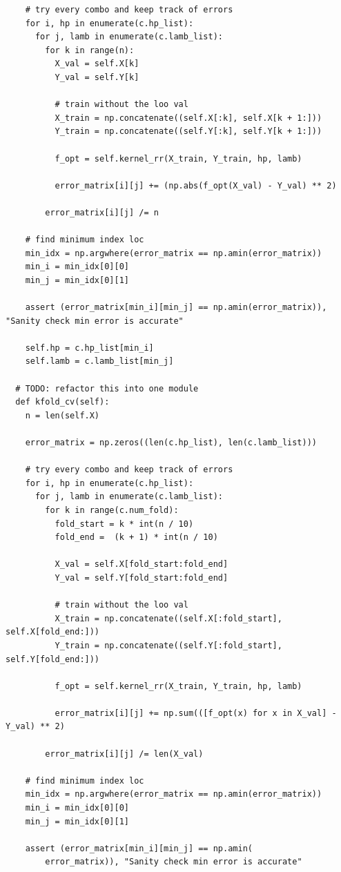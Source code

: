 \documentclass{article}
\newcommand{\1}{\mathbf{1}}
\begin{document}
{\begin{verbatim}
    # try every combo and keep track of errors
    for i, hp in enumerate(c.hp_list):
      for j, lamb in enumerate(c.lamb_list):
        for k in range(n):
          X_val = self.X[k]
          Y_val = self.Y[k]
          
          # train without the loo val
          X_train = np.concatenate((self.X[:k], self.X[k + 1:]))
          Y_train = np.concatenate((self.Y[:k], self.Y[k + 1:]))

          f_opt = self.kernel_rr(X_train, Y_train, hp, lamb)

          error_matrix[i][j] += (np.abs(f_opt(X_val) - Y_val) ** 2)
        
        error_matrix[i][j] /= n

    # find minimum index loc
    min_idx = np.argwhere(error_matrix == np.amin(error_matrix))
    min_i = min_idx[0][0]
    min_j = min_idx[0][1]

    assert (error_matrix[min_i][min_j] == np.amin(error_matrix)), "Sanity check min error is accurate"

    self.hp = c.hp_list[min_i]
    self.lamb = c.lamb_list[min_j]
  
  # TODO: refactor this into one module
  def kfold_cv(self):
    n = len(self.X)

    error_matrix = np.zeros((len(c.hp_list), len(c.lamb_list)))

    # try every combo and keep track of errors
    for i, hp in enumerate(c.hp_list):
      for j, lamb in enumerate(c.lamb_list):
        for k in range(c.num_fold):
          fold_start = k * int(n / 10)
          fold_end =  (k + 1) * int(n / 10)

          X_val = self.X[fold_start:fold_end]
          Y_val = self.Y[fold_start:fold_end]

          # train without the loo val
          X_train = np.concatenate((self.X[:fold_start], self.X[fold_end:]))
          Y_train = np.concatenate((self.Y[:fold_start], self.Y[fold_end:]))

          f_opt = self.kernel_rr(X_train, Y_train, hp, lamb)

          error_matrix[i][j] += np.sum(([f_opt(x) for x in X_val] - Y_val) ** 2)

        error_matrix[i][j] /= len(X_val)

    # find minimum index loc
    min_idx = np.argwhere(error_matrix == np.amin(error_matrix))
    min_i = min_idx[0][0]
    min_j = min_idx[0][1]

    assert (error_matrix[min_i][min_j] == np.amin(
        error_matrix)), "Sanity check min error is accurate"


\end{verbatim}}
\end{document}
